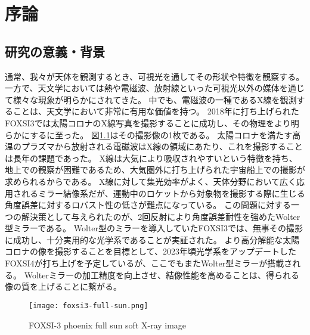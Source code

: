 \chapter{序論}
\thispagestyle{empty}
\label{chap1}
\graphicspath{{chap1/figure/}}
\minitoc


\newpage
\section{研究の意義・背景}
\label{chap1_background}

通常、我々が天体を観測するとき、可視光を通してその形状や特徴を観察する。
一方で、天文学においては熱や電磁波、放射線といった可視光以外の媒体を通じて様々な現象が明らかにされてきた。
中でも、電磁波の一種であるX線を観測することは、天文学において非常に有用な価値を持つ。
2018年に打ち上げられたFOXSI3では太陽コロナのX線写真を撮影することに成功し、その物理をより明らかにするに至った。\cite{weko_20796_1}
図\ref{fig:foxsi-fullsun-image}はその撮影像の1枚である。
太陽コロナを満たす高温のプラズマから放射される電磁波はX線の領域にあたり、これを撮影することは長年の課題であった。
X線は大気により吸収されやすいという特徴を持ち、地上での観察が困難であるため、大気圏外に打ち上げられた宇宙船上での撮影が求められるからである。
X線に対して集光効率がよく、天体分野において広く応用されるミラー結像系だが、運動中のロケットから対象物を撮影する際に生じる角度誤差に対するロバスト性の低さが難点になっている。
この問題に対する一つの解決策として与えられたのが、2回反射により角度誤差耐性を強めたWolter型ミラーである。
Wolter型のミラーを導入していたFOXSI3では、無事その撮影に成功し、十分実用的な光学系であることが実証された。
より高分解能な太陽コロナの像を撮影することを目標として、2023年頃光学系をアップデートしたFOXSI4が打ち上げを予定しているが、ここでもまたWolter型ミラーが搭載される。\cite{2019AGUFMSH31C3315V}
Wolterミラーの加工精度を向上させ、結像性能を高めることは、得られる像の質を上げることに繋がる。

\begin{figure}[h]
\centering
\texttt{[image: foxsi3-full-sun.png]}
\caption{FOXSI-3 phoenix full sun soft X-ray image}
\label{fig:foxsi-fullsun-image}
\end{figure}

\clearpage
\newpage

